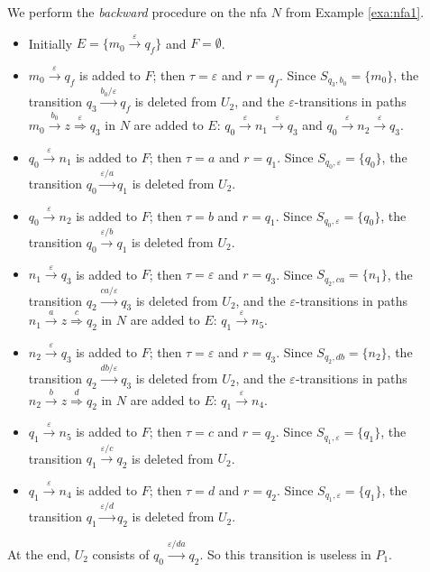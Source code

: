\documentclass{llncs}
\newcommand{\eps}{\ensuremath{\varepsilon}}
\begin{document}
\begin{example}
\label{exa:nfa2}
We perform the {\em backward} procedure on the nfa $N$ from Example \ref{exa:nfa1}.
\begin{itemize}
\item
Initially $E=\{m_0\stackrel{\eps}{\rightarrow}q_f\}$ and $F=\emptyset$.\vspace{2mm}
\item
$m_0\stackrel{\eps}{\rightarrow}q_f$ is added to $F$; then $\tau=\eps$ and $r=q_f$.
Since $S_{q_3,b_0}=\{m_0\}$, the transition $q_3\stackrel{b_0/\eps}{\rightarrow}q_f$ is deleted from $U_2$,
and the $\eps$-transitions in paths $m_0\stackrel{b_0}{\rightarrow}z\stackrel{\eps}{\Rightarrow}q_3$ in $N$ are added to $E$:
$q_0\stackrel{\eps}{\rightarrow}n_1\stackrel{\eps}{\rightarrow}q_3$ and $q_0\stackrel{\eps}{\rightarrow}n_2\stackrel{\eps}{\rightarrow}q_3$.\vspace{2mm}
\item
$q_0\stackrel{\eps}{\rightarrow}n_1$ is added to $F$; then $\tau=a$ and $r=q_1$. Since $S_{q_0,\eps}=\{q_0\}$, the transition $q_0\stackrel{\eps/a}{\rightarrow}q_1$ is deleted from $U_2$.\vspace{2mm}
\item
$q_0\stackrel{\eps}{\rightarrow}n_2$ is added to $F$; then $\tau=b$ and $r=q_1$. Since $S_{q_0,\eps}=\{q_0\}$, the transition $q_0\stackrel{\eps/b}{\rightarrow}q_1$ is deleted from $U_2$.\vspace{2mm}
\item
$n_1\stackrel{\eps}{\rightarrow}q_3$ is added to $F$; then $\tau=\eps$ and $r=q_3$.
Since $S_{q_2,ca}=\{n_1\}$, the transition $q_2\stackrel{ca/\eps}{\rightarrow}q_3$ is deleted from $U_2$,
and the $\eps$-transitions in paths $n_1\stackrel{a}{\rightarrow}z\stackrel{c}{\Rightarrow}q_2$ in $N$ are added to $E$: $q_1\stackrel{\eps}{\rightarrow}n_5$.\vspace{2mm}
\item
$n_2\stackrel{\eps}{\rightarrow}q_3$ is added to $F$; then $\tau=\eps$ and $r=q_3$.
Since $S_{q_2,db}=\{n_2\}$, the transition $q_2\stackrel{db/\eps}{\rightarrow}q_3$ is deleted from $U_2$,
and the $\eps$-transitions in paths $n_2\stackrel{b}{\rightarrow}z\stackrel{d}{\Rightarrow}q_2$ in $N$ are added to $E$: $q_1\stackrel{\eps}{\rightarrow}n_4$.\vspace{2mm}
\item
$q_1\stackrel{\eps}{\rightarrow}n_5$ is added to $F$; then $\tau=c$ and $r=q_2$. Since $S_{q_1,\eps}=\{q_1\}$, the transition $q_1\stackrel{\eps/c}{\rightarrow}q_2$ is deleted from $U_2$.\vspace{2mm}
\item
$q_1\stackrel{\eps}{\rightarrow}n_4$ is added to $F$; then $\tau=d$ and $r=q_2$. Since $S_{q_1,\eps}=\{q_1\}$, the transition $q_1\stackrel{\eps/d}{\rightarrow}q_2$ is deleted from $U_2$.
\end{itemize}
At the end, $U_2$ consists of $q_0\stackrel{\eps/da}{\rightarrow}q_2$. So this transition is useless in $P_1$.
\end{example}
\end{document}
